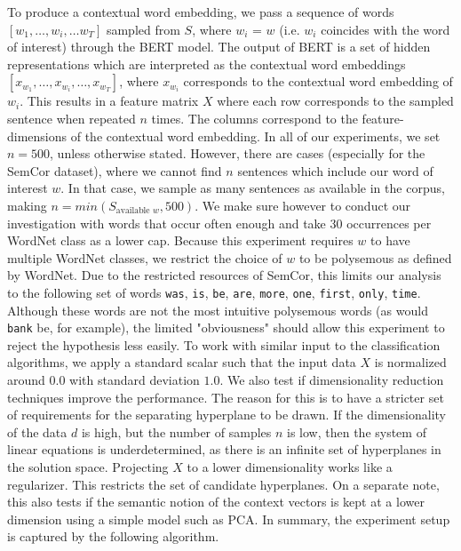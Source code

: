 \documentclass[a4paper,12pt,oneside,openright]{report}
\begin{document}
To produce a contextual word embedding, we pass a sequence of words $[w_1, \ldots, w_i, \ldots w_T]$ sampled from $S$, where $w_i$ = $w$ (i.e. $w_i$ coincides with the word of interest) through the BERT model.
The output of BERT is a set of hidden representations which are interpreted as the contextual word embeddings $[x_{w_1}, \ldots, x_{w_i}, \ldots, x_{w_T}]$, where $x_{w_i}$ corresponds to the contextual word embedding of $w_i$.
This results in a feature matrix $X$ where each row corresponds to the sampled sentence when repeated $n$ times.
The columns correspond to the feature-dimensions of the contextual word embedding.
In all of our experiments, we set $n=500$, unless otherwise stated.
However, there are cases (especially for the SemCor dataset), where we cannot find $n$ sentences which include our word of interest $w$. 
In that case, we sample as many sentences as available in the corpus, making $n=min( S_{\text{available }w}, 500)$.
We make sure however to conduct our investigation with words that occur often enough and take 30 occurrences per WordNet class as a lower cap.
Because this experiment requires $w$ to have multiple WordNet classes, we restrict the choice of $w$ to be polysemous as defined by WordNet.
Due to the restricted resources of SemCor, this limits our analysis to the following set of words \texttt{was}, \texttt{is}, \texttt{be}, \texttt{are}, \texttt{more}, \texttt{one}, \texttt{first}, \texttt{only}, \texttt{time}.
Although these words are not the most intuitive polysemous words (as would \Verb#bank# be, for example), the limited "obviousness" should allow this experiment to reject the hypothesis less easily.
To work with similar input to the classification algorithms, we apply a standard scalar such that the input data $X$ is normalized around $0.0$ with standard deviation $1.0$.
We also test if dimensionality reduction techniques improve the performance.
The reason for this is to have a stricter set of requirements for the separating hyperplane to be drawn.
If the dimensionality of the data $d$ is high, but the number of samples $n$ is low, then the system of linear equations is underdetermined, as there is an infinite set of hyperplanes in the solution space.
Projecting $X$ to a lower dimensionality works like a regularizer. This restricts the set of candidate hyperplanes.
On a separate note, this also tests if the semantic notion of the context vectors is kept at a lower dimension using a simple model such as PCA.
In summary, the experiment setup is captured by the following algorithm. \\
\end{document}
